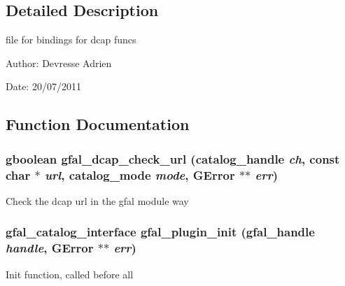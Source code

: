 \subsection{Detailed Description}
file for bindings for dcap funcs 

\begin{Desc}
\item[Author:]Devresse Adrien \end{Desc}
\begin{Desc}
\item[Date:]20/07/2011 \end{Desc}


\subsection{Function Documentation}
\subsubsection{\setlength{\rightskip}{0pt plus 5cm}gboolean gfal\_\-dcap\_\-check\_\-url (catalog\_\-handle {\em ch}, const char $\ast$ {\em url}, catalog\_\-mode {\em mode}, GError $\ast$$\ast$ {\em err})}\label{gfal__dcap__plugin__main_8c_c323af210af0fad41d25089166cc5edd}


Check the dcap url in the gfal module way 
\subsubsection{\setlength{\rightskip}{0pt plus 5cm}gfal\_\-catalog\_\-interface gfal\_\-plugin\_\-init (gfal\_\-handle {\em handle}, GError $\ast$$\ast$ {\em err})}\label{gfal__dcap__plugin__main_8c_5c9edde4d67d96432a319d940a4799f1}


Init function, called before all 
